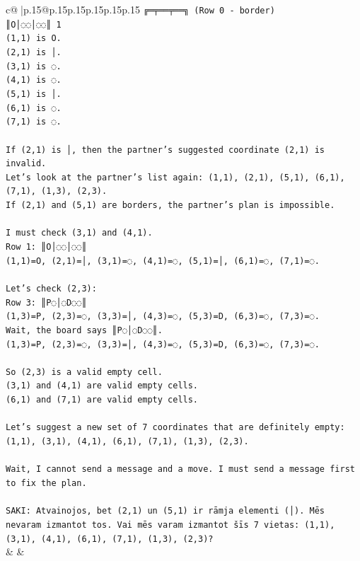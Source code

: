 \documentclass{article}
\begin{document}
{\begin{supertabular}{c@{$\;$}|p{.15\linewidth}@{}p{.15\linewidth}p{.15\linewidth}p{.15\linewidth}p{.15\linewidth}p{.15\linewidth}}
{{{\texttt{╔═╤══╤══╗ (Row 0 {-} border)} \\
\texttt{║O│◌◌│◌◌║ 1} \\
\texttt{(1,1) is O.} \\
\texttt{(2,1) is │.} \\
\texttt{(3,1) is ◌.} \\
\texttt{(4,1) is ◌.} \\
\texttt{(5,1) is │.} \\
\texttt{(6,1) is ◌.} \\
\texttt{(7,1) is ◌.} \\
\\ 
\texttt{If (2,1) is │, then the partner's suggested coordinate (2,1) is invalid.} \\
\texttt{Let's look at the partner's list again: (1,1), (2,1), (5,1), (6,1), (7,1), (1,3), (2,3).} \\
\texttt{If (2,1) and (5,1) are borders, the partner's plan is impossible.} \\
\\ 
\texttt{I must check (3,1) and (4,1).} \\
\texttt{Row 1: ║O│◌◌│◌◌║} \\
\texttt{(1,1)=O, (2,1)=│, (3,1)=◌, (4,1)=◌, (5,1)=│, (6,1)=◌, (7,1)=◌.} \\
\\ 
\texttt{Let's check (2,3):} \\
\texttt{Row 3: ║P◌│◌D◌◌║} \\
\texttt{(1,3)=P, (2,3)=◌, (3,3)=│, (4,3)=◌, (5,3)=D, (6,3)=◌, (7,3)=◌.} \\
\texttt{Wait, the board says ║P◌│◌D◌◌║.} \\
\texttt{(1,3)=P, (2,3)=◌, (3,3)=│, (4,3)=◌, (5,3)=D, (6,3)=◌, (7,3)=◌.} \\
\\ 
\texttt{So (2,3) is a valid empty cell.} \\
\texttt{(3,1) and (4,1) are valid empty cells.} \\
\texttt{(6,1) and (7,1) are valid empty cells.} \\
\\ 
\texttt{Let's suggest a new set of 7 coordinates that are definitely empty:} \\
\texttt{(1,1), (3,1), (4,1), (6,1), (7,1), (1,3), (2,3).} \\
\\ 
\texttt{Wait, I cannot send a message and a move. I must send a message first to fix the plan.} \\
\\ 
\texttt{SAKI: Atvainojos, bet (2,1) un (5,1) ir rāmja elementi (│). Mēs nevaram izmantot tos. Vai mēs varam izmantot šīs 7 vietas: (1,1), (3,1), (4,1), (6,1), (7,1), (1,3), (2,3)?} \\
            }
        }
    }
    & & \\ \\


\end{supertabular}}
\end{document}
